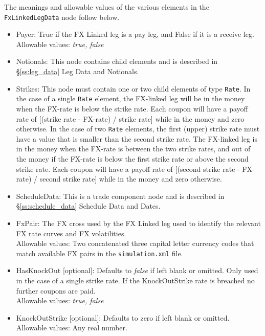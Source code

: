 The meanings and allowable values of the various elements in the \lstinline!FxLinkedLegData!  node follow below. 

\begin{itemize}
\item Payer: True if the FX Linked leg is a pay leg, and False if it is a receive leg. \\ Allowable values:  \emph{true, false}
\item Notionals: This node contains child elements and is described in \S \ref{ss:leg_data} Leg Data and Notionals. 
\item Strikes: This node must contain one or two child elements of type \lstinline!Rate!.  In the case of a single \lstinline!Rate! element, the FX-linked leg will be in the money when the FX-rate is below the strike rate.   Each coupon will have a payoff rate of [(strike rate - FX-rate) / strike rate] while in the money and zero otherwise.  
In the case of two \lstinline!Rate! elements, the first (upper) strike rate must have a value that is smaller than the second strike rate.  The FX-linked leg is in the money when the FX-rate is between the two strike rates, and out of the money if the FX-rate is below the first strike rate or above the second strike rate.    Each coupon will have a payoff rate of [(second strike rate - FX-rate) / second strike rate] while in the money and zero otherwise.  

\item ScheduleData: This is a trade component node and is described in \S \ref{ss:schedule_data} Schedule Data and Dates.   
\item FxPair: The FX cross used by the FX Linked leg used to identify the relevant FX rate curves and FX volatilities. \\ Allowable values:  Two concatenated three capital letter currency codes that match available FX pairs in the {\tt simulation.xml} file.
\item HasKnockOut [optional]: Defaults to \emph{false} if left blank or omitted. Only used in the case of a single strike rate. If the KnockOutStrike rate is breached no further coupons are paid. \\ Allowable values:  \emph{true, false}
\item KnockOutStrike [optional]: Defaults to zero if left blank or omitted. \\ Allowable values:  Any real number.

\end{itemize}

